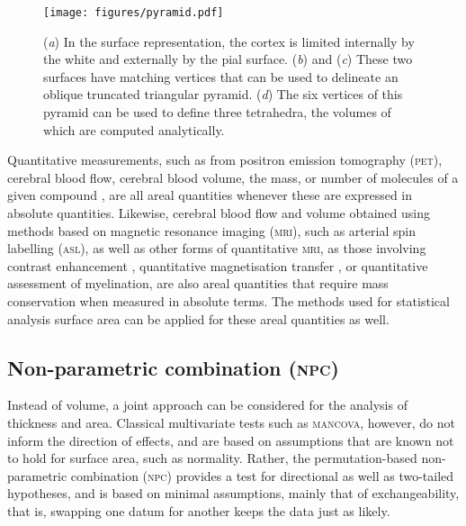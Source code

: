 \begin{figure}%
\begin{center}
\hspace*{-.7cm}
\texttt{[image: figures/pyramid.pdf]}
\caption{(\emph{a}) In the surface representation, the cortex is limited internally by the white and externally by the pial surface. (\emph{b}) and (\emph{c}) These two surfaces have matching vertices that can be used to delineate an oblique truncated triangular pyramid. (\emph{d}) The six vertices of this pyramid can be used to define three tetrahedra, the volumes of which are computed analytically.}
\label{fig:pyramid}
\end{center}
\end{figure}

Quantitative measurements, such as from positron emission tomography (\textsc{pet}), cerebral blood flow, cerebral blood volume, the mass, or number of molecules of a given compound \citep{Leahy2000, VandenHoff2005}, are all areal quantities whenever these are expressed in absolute quantities. Likewise, cerebral blood flow and volume obtained using methods based on magnetic resonance imaging (\textsc{mri}), such as arterial spin labelling (\textsc{asl}), as well as other forms of quantitative \textsc{mri}, as those involving contrast enhancement \citep{Parker2003}, quantitative magnetisation transfer \citep{Levesque2010, Harrison2015}, or quantitative assessment of myelination, are also areal quantities that require mass conservation when measured in absolute terms. The methods used for statistical analysis surface area can be applied for these areal quantities as well.

\subsection{Non-parametric combination (\textsc{npc})}

Instead of volume, a joint approach can be considered for the analysis of thickness and area. Classical multivariate tests such as \textsc{mancova}, however, do not inform the direction of effects, and are based on assumptions that are known not to hold for surface area, such as normality. Rather, the permutation-based non-parametric combination (\textsc{npc}) \citep{Pesarin2010, Winkler2016_npc} provides a test for directional as well as two-tailed hypotheses, and is based on minimal assumptions, mainly that of exchangeability, that is, swapping one datum for another keeps the data just as likely.

